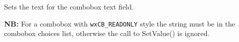 


\label{wxcomboboxsetvalue}


Sets the text for the combobox text field.

{\bf NB:} For a combobox with {\tt wxCB\_READONLY} style the string must be in
the combobox choices list, otherwise the call to SetValue() is ignored.




